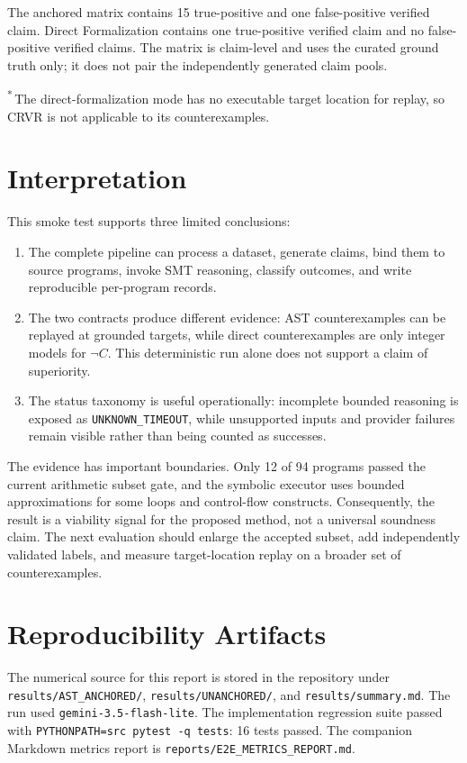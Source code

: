 \documentclass[11pt]{article}
\begin{document}
The anchored matrix contains 15 true-positive and one false-positive verified
claim.  Direct Formalization contains one true-positive verified claim and no
false-positive verified claims.  The matrix is claim-level and uses the
curated ground truth only; it does not pair the independently generated claim
pools.

\noindent\textsuperscript{*}\,The direct-formalization mode has no executable target
location for replay, so CRVR is not applicable to its counterexamples.

\section{Interpretation}

This smoke test supports three limited conclusions:

\begin{enumerate}
  \item The complete pipeline can process a dataset, generate claims, bind
  them to source programs, invoke SMT reasoning, classify outcomes, and write
  reproducible per-program records.
  \item The two contracts produce different evidence: AST counterexamples can
  be replayed at grounded targets, while direct counterexamples are only
  integer models for $\neg C$.  This deterministic run alone does not support
  a claim of superiority.
  \item The status taxonomy is useful operationally: incomplete bounded
  reasoning is exposed as \texttt{UNKNOWN\_TIMEOUT}, while unsupported inputs
  and provider failures remain visible rather than being counted as successes.
\end{enumerate}

The evidence has important boundaries.  Only 12 of 94 programs passed the
current arithmetic subset gate, and the symbolic executor uses bounded approximations
for some loops and control-flow constructs.  Consequently, the result is a
viability signal for the proposed method, not a universal soundness claim.
The next evaluation should enlarge the accepted subset, add independently
validated labels, and measure target-location replay on a broader set of
counterexamples.

\section{Reproducibility Artifacts}

The numerical source for this report is stored in the repository under
\texttt{results/AST\_ANCHORED/}, \texttt{results/UNANCHORED/}, and
\texttt{results/summary.md}.  The run used
\texttt{gemini-3.5-flash-lite}.  The implementation regression suite passed with
\texttt{PYTHONPATH=src pytest -q tests}: 16 tests passed.  The companion
Markdown metrics report is \texttt{reports/E2E\_METRICS\_REPORT.md}.
\end{document}

